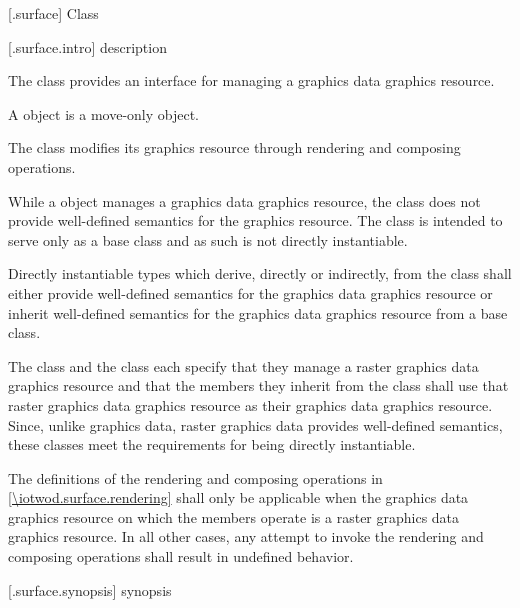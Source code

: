  [\iotwod.surface] {Class }

 [\iotwod.surface.intro] { description}

\pnum
{}%
The  class provides an interface for managing a graphics
data graphics resource.

\pnum
A  object is a move-only object.

\pnum
The  class modifies its graphics resource through rendering and composing operations.

\pnum
\begin{note}
While a  object manages a graphics data graphics resource, the  class does not provide well-defined semantics for the graphics resource. The  class is intended to serve only as a base class and as such is not directly instantiable.
\end{note}

\pnum
Directly instantiable types which derive, directly or indirectly, from the  class shall either provide well-defined semantics for the graphics data graphics resource or inherit well-defined semantics for the graphics data graphics resource from a base class.

\pnum
\begin{example}
The  class and the  class each specify that they manage a raster graphics data graphics resource and that the members they inherit from the  class shall use that raster graphics data graphics resource as their graphics data graphics resource. Since, unlike graphics data, raster graphics data provides well-defined semantics, these classes meet the requirements for being directly instantiable.
\end{example}

\pnum
The definitions of the rendering and composing operations in \ref{\iotwod.surface.rendering} shall only be applicable when the graphics data graphics resource on which the  members operate is a raster graphics data graphics resource. In all other cases, any attempt to invoke the rendering and composing operations shall result in undefined behavior.

 [\iotwod.surface.synopsis] { synopsis}

